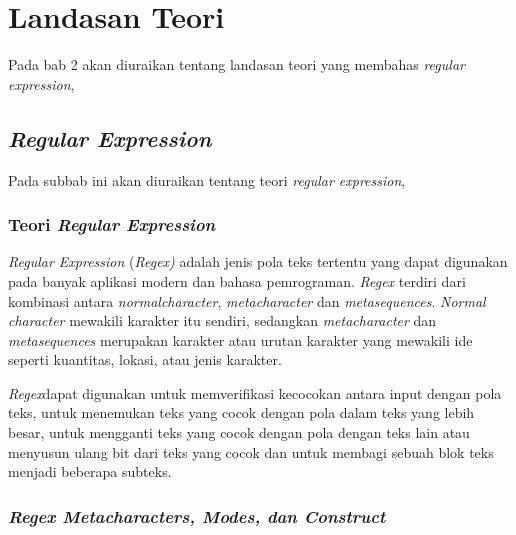 \chapter{Landasan Teori}
\label{chap:teori}

Pada bab 2 akan diuraikan tentang landasan teori yang membahas \textit{regular expression},

\section{\textit{Regular Expression}}
\label{sec:regex} 
 
Pada subbab ini akan diuraikan tentang teori \textit{regular expression},

\subsection{Teori \textit{Regular Expression}}

\textit{Regular Expression} (\textit{Regex)} adalah jenis pola teks tertentu yang dapat digunakan pada banyak aplikasi modern dan bahasa pemrograman. \textit{Regex} terdiri dari kombinasi antara \textit{normalcharacter}, \textit{metacharacter} dan \textit{metasequences}. \textit{Normal character} mewakili karakter itu sendiri, sedangkan \textit{metacharacter} dan \textit{metasequences} merupakan karakter atau urutan karakter yang mewakili ide seperti kuantitas, lokasi, atau jenis karakter.

\textit{Regex}dapat digunakan untuk memverifikasi kecocokan antara input dengan pola teks, untuk menemukan teks yang cocok dengan pola dalam teks yang lebih besar, untuk mengganti teks yang cocok dengan pola dengan teks lain atau menyusun ulang bit dari teks yang cocok dan untuk membagi sebuah blok teks menjadi beberapa subteks.

\subsection{\textit{Regex Metacharacters, Modes, dan Construct}}

